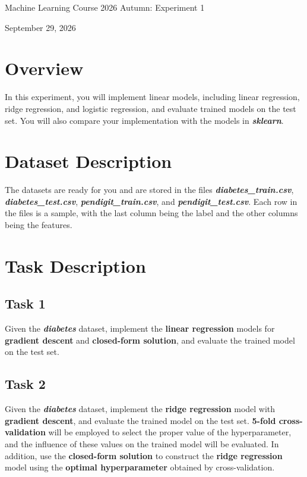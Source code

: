 \documentclass[12pt,a4paper]{article}
\begin{document}
\begin{center}
  {\LARGE Machine Learning Course 2026 Autumn: Experiment 1}

  \vspace{1.35cm}
  {\large September 29, 2026}
\end{center}

\vspace{0.7cm}

\section{Overview}

In this experiment, you will implement linear models, including linear regression,
ridge regression, and logistic regression, and evaluate trained models on the test
set. You will also compare your implementation with the models in
\textbf{\textit{sklearn}}.

\section{Dataset Description}

\begin{sloppypar}
The datasets are ready for you and are stored in the files
\textbf{\textit{diabetes\_train.csv}},
\textbf{\textit{diabetes\_test.csv}},
\textbf{\textit{pendigit\_train.csv}}, and
\textbf{\textit{pendigit\_test.csv}}. Each row in the files is a sample, with the
last column being the label and the other columns being the features.
\end{sloppypar}

\section{Task Description}

\subsection{Task 1}

Given the \textbf{\textit{diabetes}} dataset, implement the
\textbf{linear regression} models for \textbf{gradient descent} and
\textbf{closed-form solution}, and evaluate the trained model on the test set.

\subsection{Task 2}

Given the \textbf{\textit{diabetes}} dataset, implement the
\textbf{ridge regression} model with \textbf{gradient descent}, and evaluate the
trained model on the test set. \textbf{5-fold cross-validation} will be employed to
select the proper value of the hyperparameter, and the influence of these values on
the trained model will be evaluated. In addition, use the
\textbf{closed-form solution} to construct the \textbf{ridge regression} model using
the \textbf{optimal hyperparameter} obtained by cross-validation.
\end{document}
